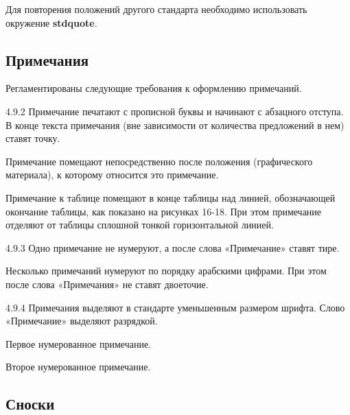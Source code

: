 \documentclass[12pt, twoside, final]{ruost}
\begin{document}
\begin{OST}
				
				\point Для повторения положений другого стандарта необходимо использовать окружение \textbf{stdquote}.
				
			\subsection{Примечания}
			
				\point Регламентированы следующие требования к оформлению примечаний.
				
				\begin{stdquote}
					\par 4.9.2 Примечание печатают с прописной буквы и начинают с абзацного отступа. В конце текста примечания (вне зависимости от количества предложений в нем) ставят точку.
					\par Примечание помещают непосредственно после положения (графического материала), к которому относится это примечание.
					\par Примечание к таблице помещают в конце таблицы над линией, обозначающей окончание таблицы, как показано на рисунках 16-18. При этом примечание отделяют от таблицы сплошной тонкой горизонтальной линией.
					\par 4.9.3 Одно примечание не нумеруют, а после слова «Примечание» ставят тире.
					\par Несколько примечаний нумеруют по порядку арабскими цифрами. При этом после слова «Примечания» не ставят двоеточие.
					\par 4.9.4 Примечания выделяют в стандарте уменьшенным размером шрифта. Слово «Примечание» выделяют разрядкой.
					\par [ГОСТ 1.5---2001]
				\end{stdquote}
				
				\begin{notes}
					\item Первое нумерованное примечание.
					\item Второе нумерованное примечание.
				\end{notes}
				
			\subsection{Сноски}
			

\end{OST}
\end{document}
